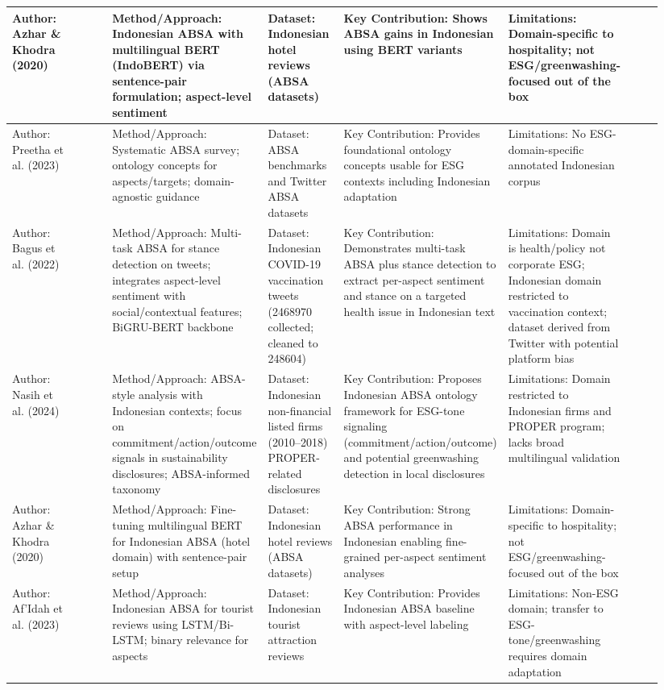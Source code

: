 \documentclass{article}
\begin{document}
\begin{landscape}
\begin{longtable}{p{0.134\linewidth} p{0.134\linewidth} p{0.134\linewidth} p{0.134\linewidth} p{0.134\linewidth} p{0.134\linewidth} p{0.134\linewidth}}
Author: Azhar \& Khodra (2020) & ~ & Method/Approach: Indonesian ABSA with multilingual BERT (IndoBERT) via sentence-pair formulation; aspect-level sentiment & Dataset: Indonesian hotel reviews (ABSA datasets) & Key Contribution: Shows ABSA gains in Indonesian using BERT variants & Limitations: Domain-specific to hospitality; not ESG/greenwashing-focused out of the box \\ \hline
Author: Preetha et al. (2023) & ~ & Method/Approach: Systematic ABSA survey; ontology concepts for aspects/targets; domain-agnostic guidance & Dataset: ABSA benchmarks and Twitter ABSA datasets & Key Contribution: Provides foundational ontology concepts usable for ESG contexts including Indonesian adaptation & Limitations: No ESG-domain-specific annotated Indonesian corpus \\ \hline
Author: Bagus et al. (2022) & ~ & Method/Approach: Multi-task ABSA for stance detection on tweets; integrates aspect-level sentiment with social/contextual features; BiGRU-BERT backbone & Dataset: Indonesian COVID-19 vaccination tweets (2468970 collected; cleaned to 248604) & Key Contribution: Demonstrates multi-task ABSA plus stance detection to extract per-aspect sentiment and stance on a targeted health issue in Indonesian text & Limitations: Domain is health/policy not corporate ESG; Indonesian domain restricted to vaccination context; dataset derived from Twitter with potential platform bias \\ \hline
Author: Nasih et al. (2024) & ~ & Method/Approach: ABSA-style analysis with Indonesian contexts; focus on commitment/action/outcome signals in sustainability disclosures; ABSA-informed taxonomy & Dataset: Indonesian non-financial listed firms (2010–2018) PROPER-related disclosures & Key Contribution: Proposes Indonesian ABSA ontology framework for ESG-tone signaling (commitment/action/outcome) and potential greenwashing detection in local disclosures & Limitations: Domain restricted to Indonesian firms and PROPER program; lacks broad multilingual validation \\ \hline
Author: Azhar \& Khodra (2020) & ~ & Method/Approach: Fine-tuning multilingual BERT for Indonesian ABSA (hotel domain) with sentence-pair setup & Dataset: Indonesian hotel reviews (ABSA datasets) & Key Contribution: Strong ABSA performance in Indonesian enabling fine-grained per-aspect sentiment analyses & Limitations: Domain-specific to hospitality; not ESG/greenwashing-focused out of the box \\ \hline
Author: Af’Idah et al. (2023) & ~ & Method/Approach: Indonesian ABSA for tourist reviews using LSTM/Bi-LSTM; binary relevance for aspects & Dataset: Indonesian tourist attraction reviews & Key Contribution: Provides Indonesian ABSA baseline with aspect-level labeling & Limitations: Non-ESG domain; transfer to ESG-tone/greenwashing requires domain adaptation \\ \hline

\end{longtable}
\end{landscape}
\end{document}
